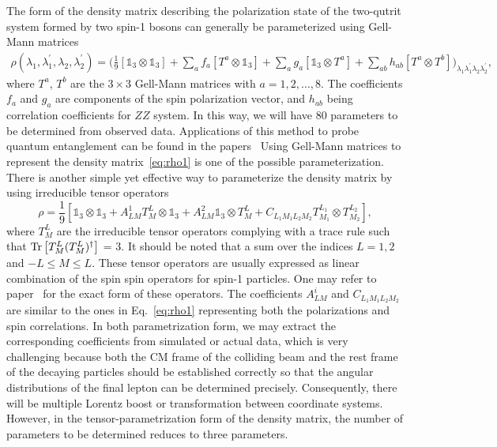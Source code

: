 \documentclass{article}
\newcommand{\II}{\mathbb{1}}
\newcommand{\lambdaA}{\lambda_{1}}
\newcommand{\lambdaB}{\lambda_{2}}
\newcommand{\lambdaAp}{\lambda_1^{\prime}}
\newcommand{\lambdaBp}{\lambda_2^{\prime}}
\begin{document}
 The form of the density matrix describing the polarization state of the two-qutrit system formed by two spin-1 bosons can generally be parameterized using Gell-Mann matrices ~\cite{Fabbrichesi:2023cev,Barr:2024djo} 
\begin{align}
\rho(\lambdaA,\lambdaAp,\lambdaB,\lambdaBp)= \Big(\frac{1}{9}\left[\mathbb{1}_3\otimes
    \mathbb{1}_3\right]+
    \sum_a f_a \left[T^a\otimes \mathbb{1}_3\right]+\sum_a g_a \left[\mathbb{1}_3\otimes T^a\right] 
    +\sum_{ab} h_{ab}  \left[T^a\otimes T^b\right]\Big)_{\lambdaA\lambdaAp\lambdaB\lambdaBp},
    \label{eq:rho1}
\end{align}
where $T^a$, $T^b$ are the $3\times
3$ Gell-Mann matrices with $a=1,2,\dots, 8$. The coefficients $f_a$ and $g_a$  are components of the spin polarization vector, and $h_{ab}$ being correlation coefficients for \(ZZ\) system. In this way, we will have 80 parameters to be determined from observed data. Applications of this method to probe quantum entanglement can be found in the papers~\cite{Fabbrichesi:2023cev,Barr:2024djo}
Using Gell-Mann matrices to represent the density matrix~\ref{eq:rho1} is one of the possible parameterization. There is another simple yet effective way to parameterize the density matrix by using irreducible tensor operators~\cite{Aguilar-Saavedra:2015yza, Aguilar-Saavedra:2017zkn, Rahaman:2021fcz}
\begin{equation}
    \rho = \frac19\left[
    \II_3\otimes\II_3 + A_{LM}^1 T_{M}^L\otimes\II_3 + A^2_{LM}\II_3\otimes T^L_{M} + C_{L_1M_1L_2M_2}T^{L_1}_{M_1}\otimes T_{M_2}^{L_2}
    \right],
    \label{eq:rho2}
\end{equation}
where $T^L_M$ are the irreducible tensor operators complying with a trace rule such that ${\rm Tr}\left[T_{M}^L (T^L_M)^\dagger\right]$ = 3. It should be noted that a sum over the indices $L = 1, 2$ and $-L \leq M \leq L $. These tensor operators are usually expressed as linear combination of the spin spin operators for spin-1 particles. One may refer to paper~\cite{Aguilar-Saavedra:2022wam} for the exact form of these operators. The coefficients $A^i_{LM}$ and $C_{L_1M_1L_2M_2}$ are similar to the ones in Eq.~\ref{eq:rho1} representing both  the polarizations and spin correlations. In both parametrization form, we may extract the corresponding coefficients from simulated or actual data, which is very challenging because both the CM frame of the colliding beam and the rest frame of the decaying particles should be established correctly so that the angular distributions of the final lepton can be determined precisely. Consequently, there will be multiple Lorentz boost or transformation between coordinate systems.  However, in the tensor-parametrization form of the density matrix, the number of parameters to be determined reduces to three parameters.
\end{document}
